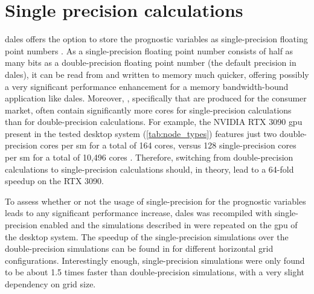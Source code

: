 \section{Single precision calculations}
\acrshort{dales} offers the option to store the prognostic variables as single-precision floating point numbers \citep{janssonCloudBotanyShallow2023}. As a single-precision floating point number consists of half as many bits as a double-precision floating point number (the default precision in \acrshort{dales}), it can be read from and written to memory much quicker, offering possibly a very significant performance enhancement for a memory bandwidth-bound application like \acrshort{dales}. Moreover, , specifically  that are produced for the consumer market, often contain significantly more cores for single-precision calculations than for double-precision calculations. For example, the NVIDIA RTX 3090 \acrshort{gpu} present in the tested desktop system (\autoref{tab:node_types}) features just two double-precision cores per \acrshort{sm} for a total of 164 cores, versus 128 single-precision cores per \acrshort{sm} for a total of 10,496 cores \citep{nvidiaIntroductionNVIDIAAmpere2021}. Therefore, switching from double-precision calculations to single-precision calculations should, in theory, lead to a 64-fold speedup on the RTX 3090. 

To assess whether or not the usage of single-precision for the prognostic variables leads to any significant performance increase, \acrshort{dales} was recompiled with single-precision enabled and the simulations described in  were repeated on the \acrshort{gpu} of the desktop system. The speedup of the single-precision simulations over the double-precision simulations can be found in  for different horizontal grid configurations. Interestingly enough, single-precision simulations were only found to be about 1.5 times faster than double-precision simulations, with a very slight dependency on grid size.

